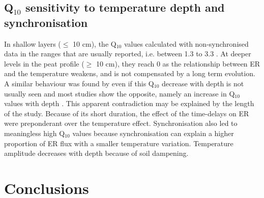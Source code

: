 \subsection{Q$_{10}$ sensitivity to temperature depth and synchronisation}

In shallow layers ($\leq$ 10 cm), the Q$_{10}$ values calculated with non-synchronised data in the ranges that are usually reported, i.e. between 1.3 to 3.3 \citep{raich1992}.
At deeper levels in the peat profile ($\geq$ 10 cm), they reach 0 as the relationship between ER and the temperature weakens, and is not compensated by a long term evolution.
A similar behaviour was found by \citet{pavelka2007} even if this Q$_{10}$ decrease with depth is not usually seen and most studies show the opposite, namely an increase in Q$_{10}$ values with depth \citep{graf2008}.
This apparent contradiction may be explained by the length of the study.
Because of its short duration, the effect of the time-delays on ER were preponderant over the temperature effect.
Synchronisation also led to meaningless high Q$_{10}$ values because synchronisation can explain a higher proportion of ER flux with a smaller temperature variation.
Temperature amplitude decreases with depth because of soil dampening.


\section{Conclusions}  %

